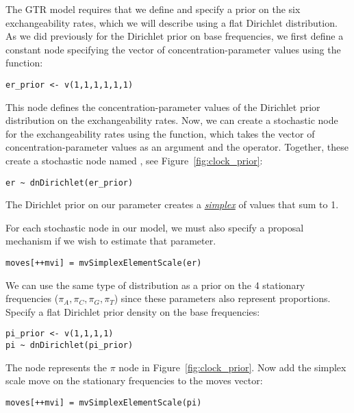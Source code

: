 The GTR model requires that we define and specify a prior on the six exchangeability rates, which we will describe using a flat Dirichlet distribution.
As we did previously for the Dirichlet prior on base frequencies, we first define a constant node specifying the vector of concentration-parameter values using the  function:
{\tt \begin{snugshade*}
\begin{lstlisting}
er_prior <- v(1,1,1,1,1,1) 
\end{lstlisting}
\end{snugshade*}}
This node defines the concentration-parameter values of the Dirichlet prior distribution on the exchangeability rates. 
Now, we can create a stochastic node for the exchangeability rates using the  function, which takes the vector of concentration-parameter values as an argument and the \cl{\rbdn} operator. 
Together, these create a stochastic node named , see Figure~\ref{fig:clock_prior}: 
{\tt \begin{snugshade*}
\begin{lstlisting}
er ~ dnDirichlet(er_prior)
\end{lstlisting}
\end{snugshade*}}
The Dirichlet prior on our parameter  creates a \href{http://en.wikipedia.org/wiki/Simplex}{\textit{simplex}} of values that sum to 1. 


For each stochastic node in our model, we must also specify a proposal mechanism if we wish to estimate that parameter. 
{\tt\small \begin{snugshade*}
\begin{lstlisting}
moves[++mvi] = mvSimplexElementScale(er) 
\end{lstlisting}
\end{snugshade*}}

We can use the same type of distribution as a prior on the 4 stationary frequencies ($\pi_A, \pi_C, \pi_G, \pi_T$) since these parameters also represent proportions. 
Specify a flat Dirichlet prior density on the base frequencies:
{\tt \begin{snugshade*}
\begin{lstlisting}
pi_prior <- v(1,1,1,1) 
pi ~ dnDirichlet(pi_prior)
\end{lstlisting}
\end{snugshade*}}

The node  represents the $\pi$ node in Figure~\ref{fig:clock_prior}.
Now add the simplex scale move on the stationary frequencies to the moves vector:
{\tt \small \begin{snugshade*}
\begin{lstlisting}
moves[++mvi] = mvSimplexElementScale(pi)  
\end{lstlisting}
\end{snugshade*}}

